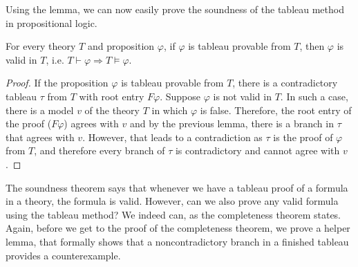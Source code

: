 Using the lemma, we can now easily prove the soundness of the tableau method in propositional logic.

\begin{theorem}
For every theory $T$ and proposition $\varphi$, if $\varphi$ is tableau provable from $T$, then $\varphi$ is valid in $T$, i.e. $T \vdash \varphi \Rightarrow T \vDash \varphi$.
\end{theorem}
\begin{proof}
If the proposition $\varphi$ is tableau provable from $T$, there is a contradictory tableau $\tau$ from $T$ with root entry $F \varphi$. Suppose $\varphi$ is not valid in $T$. In such a case, there is a model $v$ of the theory $T$ in which $\varphi$ is false. Therefore, the root entry of the proof ($F \varphi$) agrees with $v$ and by the previous lemma, there is a branch in $\tau$ that agrees with $v$. However, that leads to a contradiction as $\tau$ is the proof of $\varphi$ from $T$, and therefore every branch of $\tau$ is contradictory and cannot agree with $v$.
\end{proof}

The soundness theorem says that whenever we have a tableau proof of a formula in a theory, the formula is valid. However, can we also prove any valid formula using the tableau method? We indeed can, as the completeness theorem states. Again, before we get to the proof of the completeness theorem, we prove a helper lemma, that formally shows that a noncontradictory branch in a finished tableau provides a counterexample.

